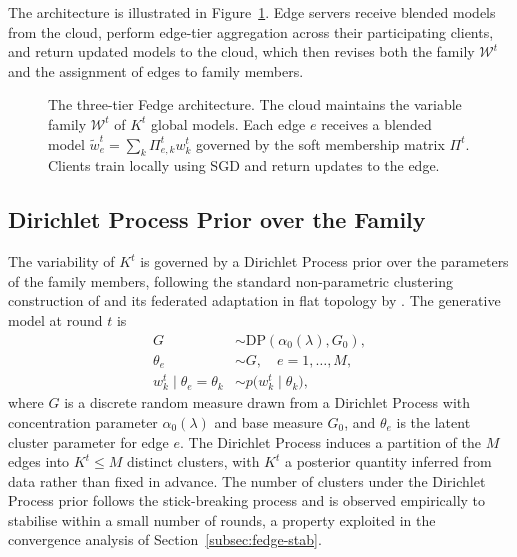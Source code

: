 The architecture is illustrated in Figure~\ref{fig:architecture}. Edge servers receive blended models from the cloud, perform edge-tier aggregation across their participating clients, and return updated models to the cloud, which then revises both the family $\mathcal{W}^t$ and the assignment of edges to family members.

\begin{figure}[!t]
\centering
\caption[The Fedge architecture]{The three-tier Fedge architecture. The cloud maintains the variable family $\mathcal{W}^t$ of $K^t$ global models. Each edge $e$ receives a blended model $\tilde{w}_e^t = \sum_k \Pi_{e,k}^t w_k^t$ governed by the soft membership matrix $\Pi^t$. Clients train locally using SGD and return updates to the edge.}
\label{fig:architecture}
\end{figure}

\subsection{Dirichlet Process Prior over the Family}
\label{subsec:fedge-dp}

The variability of $K^t$ is governed by a Dirichlet Process prior over the parameters of the family members, following the standard non-parametric clustering construction of \cite{ferguson1973bayesian} and its federated adaptation in flat topology by \cite{jaramillo2026dpmmcfl}. The generative model at round $t$ is
\begin{align}
\label{eq:dp-prior}
G &\sim \text{DP}(\alpha_0(\lambda), G_0), \\
\theta_e &\sim G, \quad e = 1, \ldots, M, \\
w_k^t \mid \theta_e = \theta_k &\sim p\big(w_k^t \mid \theta_k\big),
\end{align}
where $G$ is a discrete random measure drawn from a Dirichlet Process with concentration parameter $\alpha_0(\lambda)$ and base measure $G_0$, and $\theta_e$ is the latent cluster parameter for edge $e$. The Dirichlet Process induces a partition of the $M$ edges into $K^t \leq M$ distinct clusters, with $K^t$ a posterior quantity inferred from data rather than fixed in advance. The number of clusters under the Dirichlet Process prior follows the stick-breaking process and is observed empirically to stabilise within a small number of rounds, a property exploited in the convergence analysis of Section~\ref{subsec:fedge-stab}.

